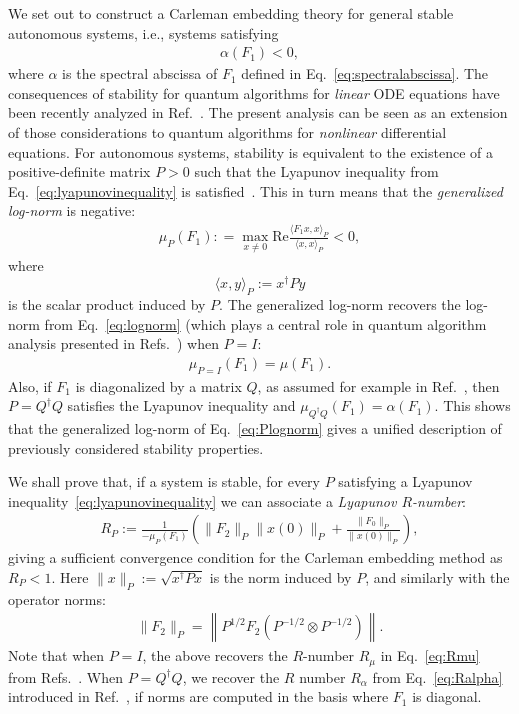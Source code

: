 \documentclass[superscriptaddress,onecolumn,nofootinbib,longbibliography,a4paper,accepted=2026-09-29]{quantumarticle}
\theoremstyle{plain}
\theoremstyle{definition}
\numberwithin{thm}{section}
\numberwithin{assumption}{section}
\numberwithin{lemma}{section}
\numberwithin{prop}{section}
\numberwithin{cor}{section}
\numberwithin{definition}{section}
\numberwithin{rmk}{section}
\numberwithin{equation}{section}
\begin{document}
We set out to construct a Carleman embedding theory for general stable autonomous systems, i.e., systems satisfying 
\begin{align}
    \alpha(F_1)<0,
\end{align} 
where $\alpha$ is the spectral abscissa of $F_1$ defined in Eq.~\eqref{eq:spectralabscissa}. The consequences of stability for quantum algorithms for \emph{linear} ODE equations have been recently analyzed in Ref.~\cite{jennings2023cost}. The present analysis can be seen as an extension of those considerations to quantum algorithms for \emph{nonlinear} differential equations. For autonomous systems, stability is equivalent to the existence of a positive-definite matrix $P>0$ such that the Lyapunov inequality from Eq.~\eqref{eq:lyapunovinequality} is satisfied~\cite{plischke2005transient}. This in turn means that the \emph{generalized log-norm} is negative:
\begin{align}
\label{eq:Plognorm}
    \mu_P(F_1) : = \max_{x \neq 0 } \mathrm{Re} \frac{\langle F_1 x, x \rangle_P}{\langle x, x \rangle_P} < 0,
\end{align}
where 
\begin{equation}
    \label{eq:scalar_P}
    \langle x, y \rangle_P := x^\dag P y    
\end{equation}
is the scalar product induced by $P$.
The generalized log-norm recovers the log-norm from Eq.~\eqref{eq:lognorm} (which plays a central role in quantum algorithm analysis presented in Refs.~\cite{krovi2023improved, costa2023further}) when $P=I$: 
\begin{align}
    \mu_{P=I}(F_1) = \mu(F_1).
\end{align} 
Also, if $F_1$ is diagonalized by a matrix $Q$, as assumed for example in Ref.~\cite{liu2021efficient}, then $P=Q^\dag Q$ satisfies the Lyapunov inequality and $\mu_{Q^\dag Q}(F_1) = \alpha(F_1)$. This shows that the generalized log-norm of Eq.~\eqref{eq:Plognorm} gives a unified description of previously considered stability properties.

We shall prove that, if a system is stable, for every $P$ satisfying a Lyapunov inequality~\eqref{eq:lyapunovinequality} we can associate a \emph{Lyapunov $R$-number}:
\begin{align}
\label{eq:RP}
     R_P :=  \frac{1}{-\mu_P(F_{1})} \left (  \|F_{2}\|_P \|x(0)\|_P + \frac{\|F_0\|_P}{ \|x(0)\|_P} \right ),
\end{align}
giving a sufficient convergence condition for the Carleman embedding method as $R_P<1$. Here
 $\| x\|_P := \sqrt{x^\dag P x}$ is the norm induced by $P$, and similarly with the operator norms:
\begin{align}
    \| F_2\|_P = \left\| P^{1/2} F_2\left( P^{-1/2} \otimes P^{-1/2}\right)\right\|.
\end{align}
Note that when $P=I$, the above recovers the $R$-number $R_\mu$ in Eq.~\eqref{eq:Rmu} from Refs.~\cite{krovi2023improved, costa2023further}. When $P=Q^\dag Q$, we recover the $R$ number $R_\alpha$ from Eq.~\eqref{eq:Ralpha} introduced in Ref.~\cite{liu2021efficient}, if norms are computed in the basis where $F_1$ is diagonal. 
\end{document}
